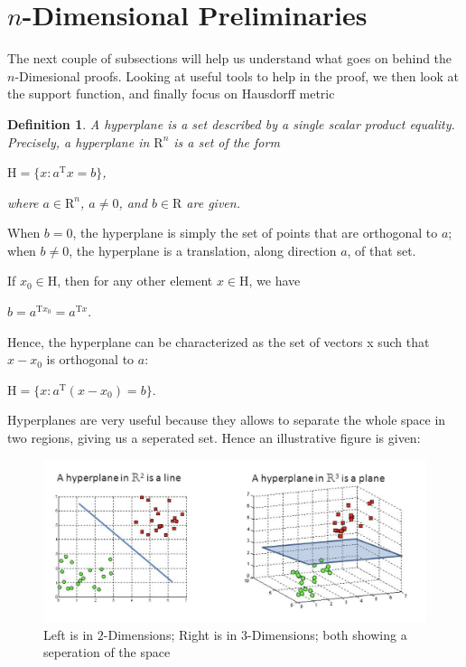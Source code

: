 \documentclass[a4paper]{book}
\newtheorem{definition}[theorem]{Definition}%
\numberwithin{theorem}{section}%
\begin{document}
\section{$n$-Dimensional Preliminaries}
The next couple of subsections will help us understand what goes on behind the $n$-Dimesional proofs. Looking at useful tools to help in the proof, we then look at the support function, and finally focus on Hausdorff metric

\begin{definition}
    A hyperplane is a set described by a single scalar product equality. Precisely, a hyperplane in $\mathrm{R}^{n}$ is a set of the form
    \begin{center}
        $\displaystyle \mathrm{H}=\{x:a^{\mathrm{T}}x=b\}$,
    \end{center}
    where $\displaystyle a\in\mathrm{R}^{n}$, $\displaystyle a\neq0$, and $\displaystyle b\in\mathrm{R}$ are given.~\citep{tsai2023applications}
\end{definition}

When $\displaystyle b=0$, the hyperplane is simply the set of points that are orthogonal to $a$; when $\displaystyle b\neq0$, the hyperplane is a translation, along direction $a$, of that set.

If $\displaystyle x_{0}\in\mathrm{H}$, then for any other element $\displaystyle x\in\mathrm{H}$, we have
\begin{center}
    $\displaystyle b=a^{\mathrm{T}x_{0}}=a^{\mathrm{T}x}$.
\end{center}

Hence, the hyperplane can be characterized as the set of vectors x such that $\displaystyle x-x_{0}$ is orthogonal to $a$:
\begin{center}
    $\displaystyle \mathrm{H}=\{x:a^{\mathrm{T}}(x-x_{0})=b\}$.
\end{center}
Hyperplanes are very useful because they allows to separate the whole space in two regions, giving us a seperated set. Hence an illustrative figure is given:
\begin{figure}[hbt!]
    \begin{center}   
        \includegraphics[width=130mm]{hyperplane}
        \caption{Left is in $2$-Dimensions; Right is in $3$-Dimensions; both showing a seperation of the space}
    \end{center}
\end{figure}\leavevmode
\end{document}
